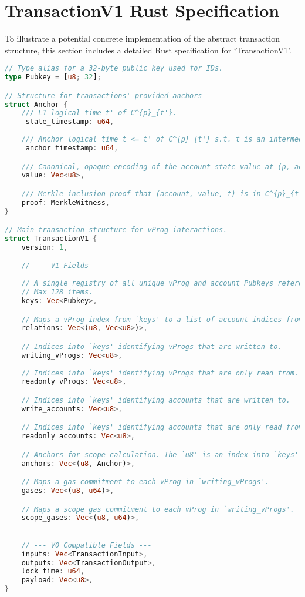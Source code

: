 \documentclass[onecolumn, 9pt, a4paper]{extarticle}
\begin{document}
\section{ TransactionV1 Rust Specification}
To illustrate a potential concrete implementation of the abstract transaction structure, this section includes a detailed Rust specification for `TransactionV1'.

\begin{lstlisting}[language=Rust, caption={TransactionV1 Rust Structure}]
// Type alias for a 32-byte public key used for IDs.
type Pubkey = [u8; 32];

// Structure for transactions' provided anchors
struct Anchor {
    /// L1 logical time t' of C^{p}_{t'}.
     state_timestamp: u64,
     
    /// Anchor logical time t <= t' of C^{p}_{t'} s.t. t is an intermediate state of C^{p}_{t'}
     anchor_timestamp: u64,

    /// Canonical, opaque encoding of the account state value at (p, account, t).
    value: Vec<u8>,

    /// Merkle inclusion proof that (account, value, t) is in C^{p}_{t'}.
    proof: MerkleWitness,
}

// Main transaction structure for vProg interactions.
struct TransactionV1 {
    version: 1,

    // --- V1 Fields ---
    
    // A single registry of all unique vProg and account Pubkeys referenced in the transaction.
    // Max 128 items.
    keys: Vec<Pubkey>, 

    // Maps a vProg index from `keys' to a list of account indices from `keys'.
    relations: Vec<(u8, Vec<u8>)>,

    // Indices into `keys' identifying vProgs that are written to.
    writing_vProgs: Vec<u8>,
    
    // Indices into `keys' identifying vProgs that are only read from.
    readonly_vProgs: Vec<u8>,

    // Indices into `keys' identifying accounts that are written to.
    write_accounts: Vec<u8>,

    // Indices into `keys' identifying accounts that are only read from.
    readonly_accounts: Vec<u8>,

    // Anchors for scope calculation. The `u8' is an index into `keys'.
    anchors: Vec<(u8, Anchor)>,

    // Maps a gas commitment to each vProg in `writing_vProgs'.
    gases: Vec<(u8, u64)>,

    // Maps a scope gas commitment to each vProg in `writing_vProgs'.
    scope_gases: Vec<(u8, u64)>,
    

    // --- V0 Compatible Fields ---
    inputs: Vec<TransactionInput>,
    outputs: Vec<TransactionOutput>,
    lock_time: u64,
    payload: Vec<u8>,
}
\end{lstlisting}
\end{document}
